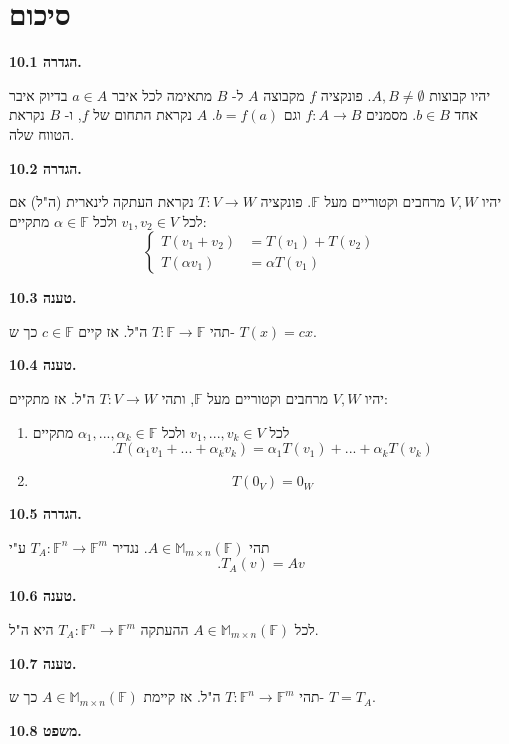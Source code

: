 \documentclass[12pt]{report}
\theoremstyle{plain}
\theoremstyle{definition}
\newcommand{\F}{\mathbb{F}}
\newcommand{\M}{\mathbb{M}}
\newcommand{\0}{\mathbf{0}}
\begin{document}
\clearpage
\section{סיכום}

\noindent\textbf{הגדרה 10.1.}

יהיו קבוצות
$A,B\neq\emptyset$.
פונקציה 
$f$
מקבוצה 
$A$
ל-
$B$
מתאימה לכל איבר 
$a\in A$
בדיוק איבר אחד 
$b\in B$.
מסמנים 
$f:A\to B$
וגם
$b=f(a)$.
$A$
נקראת התחום של 
$f$,
ו-
$B$
נקראת הטווח שלה.
\bigskip
\bigskip

\noindent\textbf{הגדרה 10.2.}

יהיו
$V,W$
מרחבים וקטוריים מעל
$\F$.
פונקציה
$T:V\to W$
נקראת העתקה לינארית (ה"ל) אם לכל
$v_1,v_2\in V$
ולכל
$\alpha\in\F$
מתקיים:
$$
\left\{
\begin{aligned}
T(v_1+v_2) &= T(v_1)+T(v_2)\\
T(\alpha v_1) &= \alpha T(v_1)
\end{aligned}
\right.
$$
\bigskip
\bigskip

\noindent\textbf{טענה 10.3.}

תהי
$T:\F\to\F$
ה"ל. אז קיים
$c\in\F$
כך ש-
$T(x)=cx$.
\bigskip
\bigskip

\noindent\textbf{טענה 10.4.}

יהיו 
$V,W$
מרחבים וקטוריים מעל
$\F$,
ותהי
$T:V\to W$
ה"ל. אז מתקיים:

\begin{enumerate}[label=\alph*.]
\item 
לכל
$v_1,...,v_k\in V$
ולכל
$\alpha_1,...,\alpha_k\in \F$
מתקיים
$$
.T(\alpha_1 v_1+...+\alpha_k v_k)=\alpha_1 T(v_1)+...+\alpha_k T(v_k)
$$


\item 
$$T(0_V)=0_W$$


\end{enumerate}
\bigskip
\bigskip

\noindent\textbf{הגדרה 10.5.}

תהי 
$A\in\M_{m\times n}(\F)$.
נגדיר
$T_A:\F^n\to\F^m$
ע"י
$$
.T_A(v)=Av
$$
\bigskip
\bigskip

\noindent\textbf{טענה 10.6.}

לכל 
$A\in\M_{m\times n}(\F)$
ההעתקה
$T_A:\F^n\to\F^m$
היא ה"ל.
\bigskip
\bigskip

\noindent\textbf{טענה 10.7.}

תהי
$T:\F^n\to\F^m$
ה"ל. אז קיימת
$A\in\M_{m\times n}(\F)$
כך ש-
$T=T_A$.
\bigskip
\bigskip

\noindent\textbf{משפט 10.8.}
\end{document}
